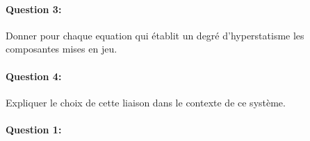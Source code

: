 \reponse[5]

\paragraph{Question 3:} Donner pour chaque equation qui établit un degré d'hyperstatisme les composantes
mises en jeu.

\reponse[5]

\paragraph{Question 4:} Expliquer le choix de cette liaison dans le contexte de ce système.

\reponse[5]




\pagestyle{correction}\setcounter{section}{0}

\paragraph{Question 1:}

